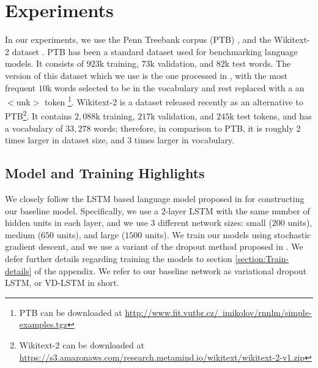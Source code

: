 \section{Experiments}
In our experiments, we use the Penn Treebank corpus (PTB) \citep{marcus1993building}, and the Wikitext-2 dataset \citep{merity2016pointer}.
PTB has been a standard dataset used for benchmarking language models.
It consists of $923$k training, $73$k validation, and $82$k test words.
The version of this dataset which we use is the one processed in \citet{mikolov2010recurrent}, with the most frequent $10$k words selected to be in the vocabulary and rest replaced with a an $<$unk$>$ token \footnote{PTB can be downloaded at \href{url}{http://www.fit.vutbr.cz/~imikolov/rnnlm/simple-examples.tgz}}.
Wikitext-2 is a dataset released recently as an alternative to PTB\footnote{Wikitext-2 can be downloaded at \href{url}{https://s3.amazonaws.com/research.metamind.io/wikitext/wikitext-2-v1.zip}}.
It contains $2,088$k training, $217$k validation, and $245$k test tokens, and has a vocabulary of $33,278$ words; therefore, in comparison to PTB, it is roughly 2 times larger in dataset size, and 3 times larger in vocabulary.

\subsection{Model and Training Highlights}
We closely follow the LSTM based language model proposed in \citet{zaremba2014recurrent} for constructing our baseline model. 
Specifically, we use a $2$-layer LSTM with the same number of hidden units in each layer, and we use $3$ different network sizes: small ($200$ units), medium ($650$ units), and large ($1500$ units).
We train our models using stochastic gradient descent, and we use a variant of the dropout method proposed in \citet{gal2015theoretically}.
We defer further details regarding training the models to section \ref{section:Train-details} of the appendix.
We refer to our baseline network as variational dropout LSTM, or VD-LSTM in short.

